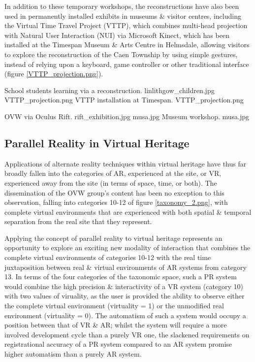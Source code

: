 In addition to these temporary workshops, the reconstructions have also been used in permanently installed exhibits in museums \& visitor centres, including the Virtual Time Travel Project (VTTP), which combines multi-head projection with Natural User Interaction (NUI) via Microsoft Kinect, which has been installed at the Timespan Museum \& Arts Centre in Helmsdale, allowing visitors to explore the reconstruction of the Caen Township by using simple gestures, instead of relying upon a keyboard, game controller or other traditional interface (figure \ref{VTTP_projection.png}).

 {School students learning via a reconstruction.} {linlithgow_children.jpg}
       {VTTP_projection.png} {VTTP installation at Timespan.} {VTTP_projection.png}

 {OVW via Oculus Rift.} {rift_exhibition.jpg}
       {musa.jpg} {Museum workshop.} {musa.jpg}


\subsection{Parallel Reality in Virtual Heritage}
Applications of alternate reality techniques within virtual heritage have thus far broadly fallen into the categories of AR, experienced at the site, or VR, experienced away from the site (in terms of space, time, or both). The dissemination of the OVW group's content has been no exception to this observation, falling into categories 10-12 of figure \ref{taxonomy_2.png}, with complete virtual environments that are experienced with both spatial \& temporal separation from the real site that they represent.

Applying the concept of parallel reality to virtual heritage represents an opportunity to explore an exciting new modality of interaction that combines the complete virtual environments of categories 10-12 with the real time juxtaposition between real \& virtual environments of AR systems from category 13. In terms of the four categories of the taxonomic space, such a PR system would combine the high precision \& interactivity of a VR system (category 10) with two values of viruality, as the user is provided the ability to observe either the complete virtual environment (virtuality = 1) or the unmodified real environment (virtuality = 0). The automatism of such a system would occupy a position between that of VR \& AR; whilst the system will require a more involved development cycle than a purely VR one, the slackened requirements on registrational accuracy of a PR system compared to an AR system promise higher automatism than a purely AR system.

